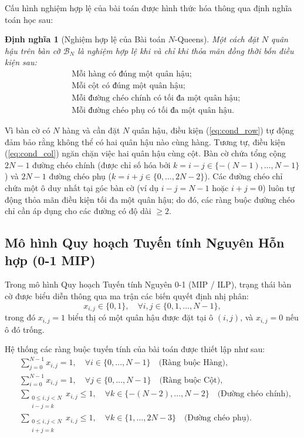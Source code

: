\documentclass[a4paper,fleqn]{cas-sc}
\newtheorem{definition}{Định nghĩa}
\begin{document}
Cấu hình nghiệm hợp lệ của bài toán được hình thức hóa thông qua định nghĩa toán học sau:
\begin{definition}[Nghiệm hợp lệ của Bài toán $N$-Queens]
Một cách đặt $N$ quân hậu trên bàn cờ $\mathcal{B}_N$ là nghiệm hợp lệ khi và chỉ khi thỏa mãn đồng thời bốn điều kiện sau:
\begin{align}
    &\text{Mỗi hàng có đúng một quân hậu;} \label{eq:cond_row}\\
    &\text{Mỗi cột có đúng một quân hậu;} \label{eq:cond_col}\\
    &\text{Mỗi đường chéo chính có tối đa một quân hậu;} \label{eq:cond_diag}\\
    &\text{Mỗi đường chéo phụ có tối đa một quân hậu.} \label{eq:cond_antidiag}
\end{align}
\end{definition}

Vì bàn cờ có $N$ hàng và cần đặt $N$ quân hậu, điều kiện (\ref{eq:cond_row}) tự động đảm bảo rằng không thể có hai quân hậu nào cùng hàng. Tương tự, điều kiện (\ref{eq:cond_col}) ngăn chặn việc hai quân hậu cùng cột. Bàn cờ chứa tổng cộng $2N - 1$ đường chéo chính (được chỉ số hóa bởi $k = i - j \in \{-(N-1), \dots, N-1\}$) và $2N - 1$ đường chéo phụ ($k = i + j \in \{0, \dots, 2N-2\}$). Các đường chéo chỉ chứa một ô duy nhất tại góc bàn cờ (ví dụ $i - j = N-1$ hoặc $i + j = 0$) luôn tự động thỏa mãn điều kiện tối đa một quân hậu; do đó, các ràng buộc đường chéo chỉ cần áp dụng cho các đường có độ dài $\ge 2$.

\subsection{Mô hình Quy hoạch Tuyến tính Nguyên Hỗn hợp (0-1 MIP)}
Trong mô hình Quy hoạch Tuyến tính Nguyên 0-1 (MIP / ILP), trạng thái bàn cờ được biểu diễn thông qua ma trận các biến quyết định nhị phân:
\begin{equation}
    x_{i,j} \in \{0, 1\}, \quad \forall i, j \in \{0, 1, \dots, N-1\},
\end{equation}
trong đó $x_{i,j} = 1$ biểu thị có một quân hậu được đặt tại ô $(i, j)$, và $x_{i,j} = 0$ nếu ô đó trống.

Hệ thống các ràng buộc tuyến tính của bài toán được thiết lập như sau:
\begin{align}
    &\sum_{j=0}^{N-1} x_{i,j} = 1, \quad \forall i \in \{0, \dots, N-1\} \quad \text{(Ràng buộc Hàng)}, \label{eq:mip_row}\\
    &\sum_{i=0}^{N-1} x_{i,j} = 1, \quad \forall j \in \{0, \dots, N-1\} \quad \text{(Ràng buộc Cột)}, \label{eq:mip_col}\\
    &\sum_{\substack{0 \le i, j < N \\ i - j = k}} x_{i,j} \le 1, \quad \forall k \in \{-(N-2), \dots, N-2\} \quad \text{(Đường chéo chính)}, \label{eq:mip_diag}\\
    &\sum_{\substack{0 \le i, j < N \\ i + j = k}} x_{i,j} \le 1, \quad \forall k \in \{1, \dots, 2N-3\} \quad \text{(Đường chéo phụ)}. \label{eq:mip_antidiag}
\end{align}
\end{document}
